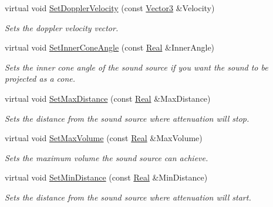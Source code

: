 \begin{DoxyCompactItemize}
virtual void \hyperlink{classMezzanine_1_1Audio_1_1Sound_aa14440b5281f08d50be12aa7c90a97d2}{SetDopplerVelocity} (const \hyperlink{classMezzanine_1_1Vector3}{Vector3} \&Velocity)
\begin{DoxyCompactList}\small\item\em Sets the doppler velocity vector. \item\end{DoxyCompactList}\item 
virtual void \hyperlink{classMezzanine_1_1Audio_1_1Sound_a23599ad48da5e5d2dbc2a194c12d2cda}{SetInnerConeAngle} (const \hyperlink{namespaceMezzanine_a726731b1a7df72bf3583e4a97282c6f6}{Real} \&InnerAngle)
\begin{DoxyCompactList}\small\item\em Sets the inner cone angle of the sound source if you want the sound to be projected as a cone. \item\end{DoxyCompactList}\item 
virtual void \hyperlink{classMezzanine_1_1Audio_1_1Sound_a77de9e890d539b951b915437f160b4c6}{SetMaxDistance} (const \hyperlink{namespaceMezzanine_a726731b1a7df72bf3583e4a97282c6f6}{Real} \&MaxDistance)
\begin{DoxyCompactList}\small\item\em Sets the distance from the sound source where attenuation will stop. \item\end{DoxyCompactList}\item 
virtual void \hyperlink{classMezzanine_1_1Audio_1_1Sound_a938e5d0ab3367e9f2191b75b9f2829cd}{SetMaxVolume} (const \hyperlink{namespaceMezzanine_a726731b1a7df72bf3583e4a97282c6f6}{Real} \&MaxVolume)
\begin{DoxyCompactList}\small\item\em Sets the maximum volume the sound source can achieve. \item\end{DoxyCompactList}\item 
virtual void \hyperlink{classMezzanine_1_1Audio_1_1Sound_aac06e4db9ebd1e0f04ee1727539a1ff5}{SetMinDistance} (const \hyperlink{namespaceMezzanine_a726731b1a7df72bf3583e4a97282c6f6}{Real} \&MinDistance)
\begin{DoxyCompactList}\small\item\em Sets the distance from the sound source where attenuation will start. \item\end{DoxyCompactList}\item 

\end{DoxyCompactItemize}
